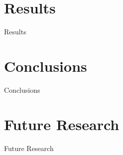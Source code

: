 \documentclass[pdf]{beamer}
\begin{document}
\section{Results}
\begin{frame}{Results}

\end{frame}

\section{Conclusions}
\begin{frame}{Conclusions}

\end{frame}

\section{Future Research}
\begin{frame}{Future Research}

\end{frame}
\end{document}
